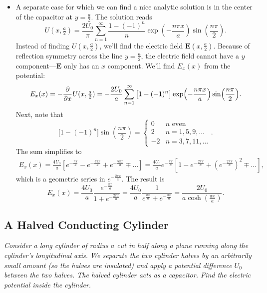 \documentclass[11pt, a4paper]{article}
\renewcommand{\vec}[1]{\bm{#1}} %
\newcommand{\E}{\vec{E}}  %
\begin{document}
\begin{itemize}
	\item A separate case for which we can find a nice analytic solution is in the center of the capacitor at $ y = \frac{a}{2} $. The solution reads
	\begin{equation*}
		U(x, \tfrac{a}{2}) = \frac{2U_{0}}{\pi} \sum_{n = 1}^{\infty}\frac{1 - (-1)^{n}}{n}\exp(-\frac{n\pi x}{a}) \sin(\frac{n\pi}{2}).
	\end{equation*}
	Instead of finding $ U(x, \tfrac{a}{2}) $, we'll find the electric field $ \E(x, \tfrac{a}{2}) $. Because of reflection symmetry across the line $ y = \frac{a}{2} $, the electric field cannot have a $ y $ component---$ \E $ only has an $ x $ component. We'll find $ E_{x}(x) $ from the potential:
	\begin{equation*}
		E_{x}(x) = -\pdv{}{x}U(x, \tfrac{a}{2}) = -\frac{2U_{0}}{a} \sum_{n = 1}^{\infty}\big[1 - (-1)^{n}\big]\exp(-\frac{n\pi x}{a}) \sin(\frac{n\pi}{2}).
	\end{equation*}
	Next, note that
	\begin{equation*}
		\big[1 - (-1)^{n}\big]\sin(\frac{n\pi}{2}) = 
		\begin{cases}
			0 & n \text{ even}\\
			2 & n = 1, 5, 9, \ldots\\
			- 2 & n = 3, 7, 11, \ldots
		\end{cases}.
	\end{equation*}
	The sum simplifies to
	\begin{align*}
		E_{x}(x) = \frac{4U_{0}}{a}\left[e^{-\frac{\pi x}{a}} - e^{-\frac{3\pi x}{a}} + e^{-\frac{5\pi x}{a}} \mp \ldots \right] = \frac{4U_{0}}{a}e^{-\frac{\pi x}{a}}\left[1 - e^{-\frac{2\pi x}{a}} + \left(e^{-\frac{2\pi x}{a}}\right)^{2}\mp \ldots \right],
	\end{align*}
	which is a geometric series in $ e^{-\frac{2\pi x}{a}} $. The result is
	\begin{equation*}
		E_{x}(x) =  \frac{4U_{0}}{a}\frac{e^{-\frac{\pi x}{a}}}{1 + e^{-\frac{2\pi x}{a}}} = \frac{4U_{0}}{a}\frac{1}{e^{\frac{\pi x}{a}} + e^{-\frac{\pi x}{a}}} = \frac{2U_{0}}{a\cosh(\frac{\pi x}{a})}.
	\end{equation*}
\end{itemize}

\subsection{A Halved Conducting Cylinder}
\textit{Consider a long cylinder of radius $ a $ cut in half along a plane running along the cylinder's longitudinal axis. We separate the two cylinder halves by an arbitrarily small amount (so the halves are insulated) and apply a potential difference $ U_{0} $ between the two halves. The halved cylinder acts as a capacitor. Find the electric potential inside the cylinder.}
\end{document}
